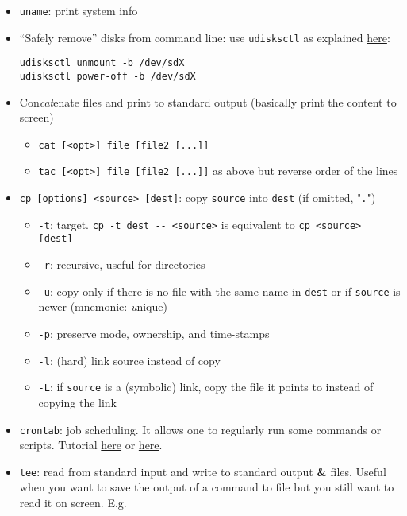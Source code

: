 \documentclass[a4paper,12pt,%
              final%
              ]{article}
\begin{document}
\begin{itemize}
  \item \texttt{uname}: print system info
  \item ``Safely remove'' disks from command line: use \texttt{udisksctl} as explained \href{https://askubuntu.com/questions/532586/what-is-the-command-line-equivalent-of-safely-remove-drive}{here}:
\begin{verbatim}
udisksctl unmount -b /dev/sdX
udisksctl power-off -b /dev/sdX
\end{verbatim}
  \item Con\emph{cat}enate files and print to standard output (basically print the content to screen)
    \begin{itemize}
      \item \verb|cat [<opt>] file [file2 [...]]|
      \item \verb|tac [<opt>] file [file2 [...]]| as above but reverse order of the lines
    \end{itemize}
  \item \verb|cp [options] <source> [dest]|: copy \texttt{source} into \texttt{dest} (if omitted, "\texttt{.}")
    \begin{itemize}
      \item \verb|-t|: target. \verb|cp -t dest -- <source>| is equivalent to \verb|cp <source> [dest]|
      \item \verb|-r|: recursive, useful for directories
      \item \verb|-u|: copy only if there is no file with the same name in \texttt{dest} or if \texttt{source} is newer (mnemonic: \emph{u}nique)
      \item \verb|-p|: preserve mode, ownership, and time-stamps
      \item \verb|-l|: (hard) link source instead of copy
      \item \verb|-L|: if \texttt{source} is a (symbolic) link, copy the file it points to instead of copying the link
    \end{itemize}
  \item \verb|crontab|: job scheduling. It allows one to regularly run some commands or scripts. Tutorial \href{https://www.adminschoice.com/crontab-quick-reference}{here} or \href{https://www.computerhope.com/unix/ucrontab.htm}{here}.
  \item \texttt{tee}: read from standard input and write to standard output \textbf{\&} files. Useful when you want to save the output of a command to file but you still want to read it on screen. E.g.
\begin{verbatim}

\end{verbatim}
\end{itemize}
\end{document}
